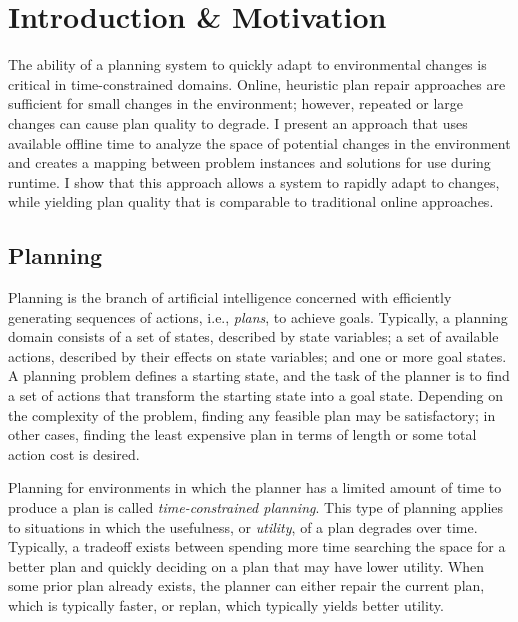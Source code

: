 \chapter{Introduction \& Motivation}
\thispagestyle{plain}

\label{ch:introduction}

The ability of a planning system to quickly adapt to environmental changes is critical in time-constrained domains.  Online, heuristic plan repair approaches are sufficient for small changes in the environment; however, repeated or large changes can cause plan quality to degrade. I present an approach that uses available offline time to analyze the space of potential changes in the environment and creates a mapping between problem instances and solutions for use during runtime.  I show that this approach allows a system to rapidly adapt to changes, while yielding plan quality that is comparable to traditional online approaches.

\section{Planning}

Planning is the branch of artificial intelligence concerned with efficiently generating sequences of actions, i.e., \textit{plans}, to achieve goals.  Typically, a planning domain consists of a set of states, described by state variables; a set of available actions, described by their effects on state variables; and one or more goal states.  A planning problem defines a starting state, and the task of the planner is to find a set of actions that transform the starting state into a goal state.  Depending on the complexity of the problem, finding any feasible plan may be satisfactory; in other cases, finding the least expensive plan in terms of length or some total action cost is desired.

Planning for environments in which the planner has a limited amount of time to produce a plan is called \textit{time-constrained planning}.  This type of planning applies to situations in which the usefulness, or \textit{utility}, of a plan degrades over time.  Typically, a tradeoff exists between spending more time searching the space for a better plan and quickly deciding on a plan that may have lower utility.  When some prior plan already exists, the planner can either repair the current plan, which is typically faster, or replan, which typically yields better utility.



